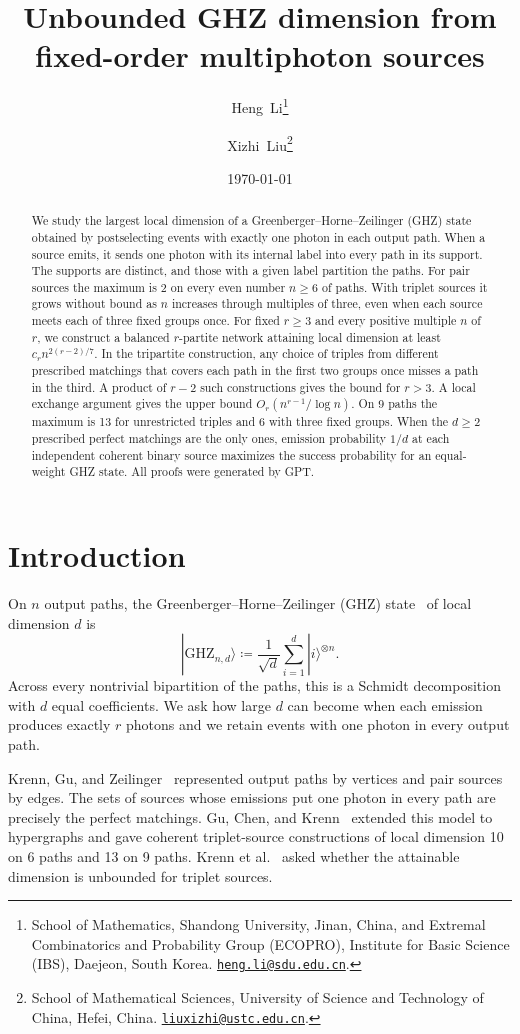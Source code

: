 \documentclass[10pt]{article}
\title{\Large\bfseries Unbounded GHZ dimension from fixed-order multiphoton sources}
\author{
Heng~Li\thanks{School of Mathematics, Shandong University, Jinan, China, and Extremal Combinatorics and Probability Group (ECOPRO), Institute for Basic Science (IBS), Daejeon, South Korea. \href{mailto:heng.li@sdu.edu.cn}{\nolinkurl{heng.li@sdu.edu.cn}}.}
\and
Xizhi~Liu\thanks{School of Mathematical Sciences, University of Science and Technology of China, Hefei, China. \href{mailto:liuxizhi@ustc.edu.cn}{\nolinkurl{liuxizhi@ustc.edu.cn}}.}
}
\date{\today}
\numberwithin{equation}{section}
\theoremstyle{definition}
\begin{document}
\maketitle
\begin{abstract}
We study the largest local dimension of a Greenberger--Horne--Zeilinger (GHZ) state obtained by postselecting events with exactly one photon in each output path. When a source emits, it sends one photon with its internal label into every path in its support. The supports are distinct, and those with a given label partition the paths. For pair sources the maximum is 2 on every even number $n\ge6$ of paths. With triplet sources it grows without bound as $n$ increases through multiples of three, even when each source meets each of three fixed groups once. For fixed $r\ge3$ and every positive multiple $n$ of $r$, we construct a balanced $r$-partite network attaining local dimension at least $c_r n^{2(r-2)/7}$. In the tripartite construction, any choice of triples from different prescribed matchings that covers each path in the first two groups once misses a path in the third. A product of $r-2$ such constructions gives the bound for $r>3$. A local exchange argument gives the upper bound $O_r(n^{r-1}/\log n)$. On 9 paths the maximum is 13 for unrestricted triples and 6 with three fixed groups. When the $d\ge2$ prescribed perfect matchings are the only ones, emission probability $1/d$ at each independent coherent binary source maximizes the success probability for an equal-weight GHZ state.
All proofs were generated by GPT.
\end{abstract}

\section{Introduction}\label{sec:introduction}

On $n$ output paths, the Greenberger--Horne--Zeilinger (GHZ) state~\cite{GreenbergerHorneZeilinger1989,Lawrence2014} of local dimension $d$ is
\begin{equation}
 |\mathrm{GHZ}_{n,d}\rangle\coloneqq\frac{1}{\sqrt d}\sum_{i=1}^{d}|i\rangle^{\otimes n}.
 \label{eq:GHZ-definition}
\end{equation}
Across every nontrivial bipartition of the paths, this is a Schmidt decomposition with $d$ equal coefficients. We ask how large $d$ can become when each emission produces exactly $r$ photons and we retain events with one photon in every output path.

Krenn, Gu, and Zeilinger~\cite{KrennGuZeilinger2017} represented output paths by vertices and pair sources by edges. The sets of sources whose emissions put one photon in every path are precisely the perfect matchings. Gu, Chen, and Krenn~\cite{GuChenKrenn2020} extended this model to hypergraphs and gave coherent triplet-source constructions of local dimension 10 on 6 paths and 13 on 9 paths. Krenn et al.~\cite{KrennEtAl2026NoGo} asked whether the attainable dimension is unbounded for triplet sources.
\end{document}
